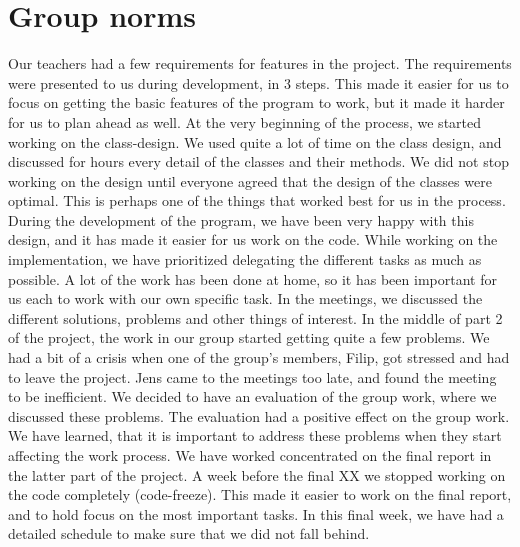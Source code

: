 \chapter{Group norms}
Our teachers had a few requirements for features in the project. The
requirements were presented to us during development, in 3 steps. This made it
easier for us to focus on getting the basic features of the program to work, but
it made it harder for us to plan ahead as well. At the very beginning of the
process, we started working on the class-design. We used quite a lot of time on
the class design, and discussed for hours every detail of the classes and their
methods. We did not stop working on the design until everyone agreed that the
design of the classes were optimal. This is perhaps one of the things that
worked best for us in the process. During the development of the program, we
have been very happy with this design, and it has made it easier for us work on
the code. While working on the implementation, we have prioritized  delegating
the different tasks as much as possible. A lot of the work has been done at
home, so it has been important for us each to work with our own specific task.
In the meetings, we discussed the different solutions, problems and other things
of interest. In the middle of part 2 of the project, the work in our group
started getting quite a few problems. We had a bit of a crisis when one of the
group's members, Filip, got stressed and had to leave the project. Jens came to
the meetings too late, and found the meeting to be inefficient. We decided to
have an evaluation of the group work, where we discussed these problems. The
evaluation had a positive effect on the group work. We have learned, that it is
important to address these problems when they start affecting the work process.
We have worked concentrated on the final report in the latter part of the
project. A week before the final XX we stopped working on the code completely
(code-freeze). This made it easier to work on the final report, and to hold
focus on the most important tasks. In this final week, we have had a detailed
schedule to make sure that we did not fall behind.
